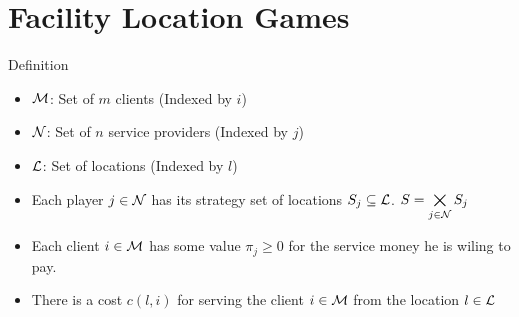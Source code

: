 \documentclass[aspectratio=1610]{beamer}
\begin{document}
\section{Facility Location Games}

\begin{frame}{Definition}
	\begin{itemize}
		\item $\mathcal{M}$: Set of $m$ clients (Indexed by $i$)
		\item $\mathcal{N}$: Set of $n$ service providers (Indexed by $j$)
		\item $\mathcal{L}$: Set of locations (Indexed by $l$)\pause
		
        \item Each player $j\in \mathcal{N}$ has its strategy set of locations $S_j\subseteq \mathcal{L}$. $S=\bigtimes\limits_{j\in\mathcal{N}}S_j$\pause
		
        \item Each client $i\in \mathcal{M}$ has some value $\pi_j\geq 0$ for the service money he is wiling to pay.\pause
        
        \item There is a cost $c(l,i)$ for serving the client $i\in\mathcal{M}$ from the location $l\in\mathcal{L}$
	\end{itemize}


\end{frame}
\end{document}
